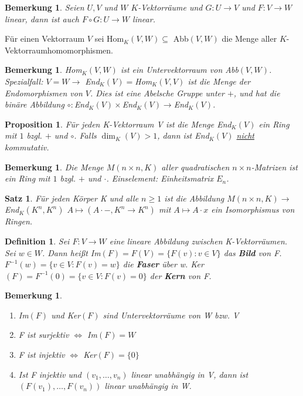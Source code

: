 \documentclass[12pt,a4paper]{article}
\theoremstyle{plain}
\newtheorem{Satz}[Theorem]{Satz}
\newtheorem{Prop}[Theorem]{Proposition}
\newtheorem{Definition}[Theorem]{Definition}
\newtheorem{Bemerkung}[Theorem]{Bemerkung}
\newcommand{\herv}[1]{{\emph{\textbf{#1}}}}
\numberwithin{equation}{section}
\begin{document}
\begin{Bemerkung}
Seien $U,V$ und $W$ $K$-Vektorräume und $G:U\rightarrow V$ und $F:V \rightarrow W$ linear, dann ist auch $F\circ G:U\rightarrow W$ linear.
\end{Bemerkung}
Für einen Vektorraum $V$ sei Hom$_K(V,W)\subseteq$ Abb$(V,W)$ die Menge aller $K$-Vektorraumho\-mo\-mor\-phis\-men.
\begin{Bemerkung}
Hom$_K(V,W)$ ist ein Untervektorraum von Abb$(V,W)$.\\
Spezialfall: $V=W \rightarrow$ End$_K(V)=$Hom$_K(V,V)$ ist die Menge der Endomorphismen von $V$. Dies ist eine Abelsche Gruppe unter $+$, und hat die binäre Abbildung $\circ: $End$_K(V)\times$End$_K(V) \rightarrow$End$_K(V)$. 
\end{Bemerkung}
\begin{Prop}
Für jeden K-Vektorraum V ist die Menge \emph{End}$_K(V)$ ein Ring mit $1$ bzgl. $+$ und $\circ$. Falls $\dim_K(V)>1$, dann ist \emph{End}$_K(V)$ \underline{nicht} kommutativ.
\end{Prop}
\begin{Bemerkung}
Die Menge $M(n\times n, K)$ aller quadratischen $n\times n$-Matrizen ist ein Ring mit $1$ bzgl. $+$ und $\cdot$. Einselement: Einheitsmatrix $E_n$.
\end{Bemerkung}
\begin{Satz}
Für jeden Körper K und alle $n\geq 1$ ist die Abbildung $M(n\times n, K)\rightarrow $\emph{End}$_K(K^n,K^n)$ $A\mapsto (A\cdot -, K^n \rightarrow K^n)$ mit $A\mapsto A\cdot x$ ein Isomorphismus von Ringen.
\end{Satz}
\begin{Definition}
Sei $F:V\rightarrow W$ eine lineare Abbildung zwischen K-Vektorräumen. Sei $w\in W$. Dann heißt \emph{Im}$(F)=F(V)=\{F(v):v\in V\}$ das \herv{Bild} von F. $F^{-1}(w)=\{v\in V: F(v)=w\}$ die \herv{Faser} über w. \emph{Ker}$(F)=F^{-1}(0)=\{v\in V: F(v)=0\}$ der \herv{Kern} von F.
\end{Definition}
\begin{Bemerkung}
\begin{enumerate}
\renewcommand{\labelenumi}{\emph{\alph{enumi})}}
\item Im$(F)$ und Ker$(F)$ sind Untervektorräume von W bzw. V 
\item F ist surjektiv $\Leftrightarrow$ Im$(F)=W$ 
\item F ist injektiv $\Leftrightarrow$ Ker$(F)=\{0\}$
\item Ist F injektiv und $(v_1,\ldots,v_n)$ linear unabhängig in V, dann ist $(F(v_1),\ldots,F(v_n))$ linear unabhängig in W.
\end{enumerate}
\end{Bemerkung}
\end{document}
